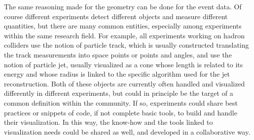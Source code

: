 \documentclass[12pt,a4paper]{article}
\begin{document}
The same reasoning made for the geometry can be done for the event data. Of course different experiments detect different objects
and measure different quantities, but there are many common entities, especially among experiments within the same research field.
For example, all experiments working on hadron colliders use the notion of particle track, which is usually constructed translating
the track measurements into space points or points and angles, and use the notion of particle jet, usually
visualized as a cone whose length is related to its energy and whose radius is linked to the specific algorithm used for the jet
reconstruction. Both of these objects are currently often handled and visualized differently in different experiments, but could in principle
be the target of a common definition within the community. If so, experiments could share best practices or snippets of code,
if not complete basic tools, to build and handle their visualization. In this way, the know-how and the tools linked to visualization needs
could be shared as well, and developed in a collaborative way.


\end{document}
